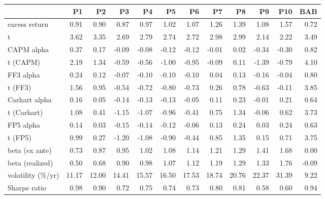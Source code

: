 \begin{tabular}{lrrrrrrrrrrr}
\toprule
 & P1 & P2 & P3 & P4 & P5 & P6 & P7 & P8 & P9 & P10 & BAB \\
\midrule
excess return & 0.91 & 0.90 & 0.87 & 0.97 & 1.02 & 1.07 & 1.26 & 1.39 & 1.08 & 1.57 & 0.72 \\
  t & 3.62 & 3.35 & 2.69 & 2.79 & 2.74 & 2.72 & 2.98 & 2.99 & 2.14 & 2.22 & 3.49 \\
CAPM alpha & 0.37 & 0.17 & -0.09 & -0.08 & -0.12 & -0.12 & -0.01 & 0.02 & -0.34 & -0.30 & 0.82 \\
  t (CAPM) & 2.19 & 1.34 & -0.59 & -0.56 & -1.00 & -0.95 & -0.09 & 0.11 & -1.39 & -0.79 & 4.10 \\
FF3 alpha & 0.24 & 0.12 & -0.07 & -0.10 & -0.10 & -0.10 & 0.04 & 0.13 & -0.16 & -0.04 & 0.80 \\
  t (FF3) & 1.56 & 0.95 & -0.54 & -0.72 & -0.80 & -0.73 & 0.26 & 0.78 & -0.63 & -0.11 & 3.85 \\
Carhart alpha & 0.16 & 0.05 & -0.14 & -0.13 & -0.13 & -0.05 & 0.11 & 0.23 & -0.01 & 0.21 & 0.64 \\
  t (Carhart) & 1.08 & 0.41 & -1.15 & -1.07 & -0.96 & -0.41 & 0.75 & 1.34 & -0.06 & 0.62 & 3.73 \\
FP5 alpha & 0.14 & 0.03 & -0.15 & -0.14 & -0.12 & -0.06 & 0.13 & 0.24 & 0.03 & 0.24 & 0.63 \\
  t (FP5) & 0.99 & 0.27 & -1.20 & -1.08 & -0.90 & -0.44 & 0.85 & 1.35 & 0.15 & 0.71 & 3.75 \\
beta (ex ante) & 0.73 & 0.87 & 0.95 & 1.02 & 1.08 & 1.14 & 1.21 & 1.29 & 1.41 & 1.68 & 0.00 \\
beta (realized) & 0.50 & 0.68 & 0.90 & 0.98 & 1.07 & 1.12 & 1.19 & 1.29 & 1.33 & 1.76 & -0.09 \\
volatility (\%/yr) & 11.17 & 12.00 & 14.41 & 15.57 & 16.50 & 17.53 & 18.74 & 20.76 & 22.37 & 31.39 & 9.22 \\
Sharpe ratio & 0.98 & 0.90 & 0.72 & 0.75 & 0.74 & 0.73 & 0.80 & 0.81 & 0.58 & 0.60 & 0.94 \\
\bottomrule
\end{tabular}
